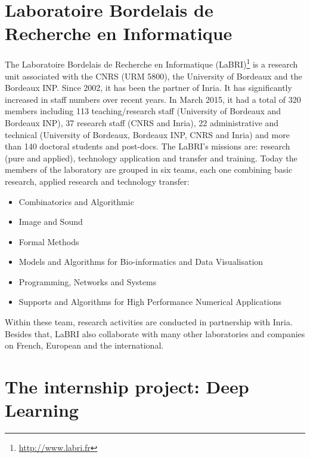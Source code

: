\documentclass[hidelinks,12pt,a4paper]{report}
\begin{document}
\section{Laboratoire Bordelais de Recherche en Informatique}
The Laboratoire Bordelais de Recherche en Informatique (LaBRI)\footnote{\url{http://www.labri.fr}} is a research unit associated with the CNRS (URM 5800), the University of Bordeaux and the Bordeaux INP. Since 2002, it has been the partner of Inria. It has significantly increased in staff numbers over recent years.
In March 2015, it had a total of 320 members including 113 teaching/research staff (University of Bordeaux and Bordeaux INP), 37 research staff (CNRS and Inria), 22 administrative and technical (University of Bordeaux, Bordeaux INP, CNRS and Inria) and more than 140 doctoral
students and post-docs. The LaBRI’s missions are: research (pure and applied), technology application and transfer and training.
Today the members of the laboratory are grouped in six teams, each one combining basic research, applied research and technology transfer:
\begin{itemize}
	\item Combinatorics and Algorithmic
	\item Image and Sound
	\item Formal Methods
	\item Models and Algorithms for Bio-informatics and Data Visualisation
	\item Programming, Networks and Systems
	\item Supports and Algorithms for High Performance Numerical Applications
\end{itemize}
Within these team, research activities are conducted in partnership with Inria. Besides that, LaBRI also collaborate with many other laboratories and companies on French, European and the international.
\newpage
\section{The internship project: Deep Learning}
\end{document}
